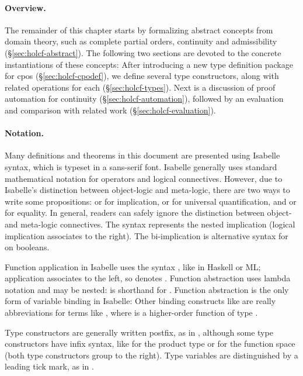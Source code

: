 \paragraph{Overview.} The remainder of this chapter starts by formalizing abstract concepts from domain theory, such as complete partial orders, continuity and admissibility (\S\ref{sec:holcf-abstract}). The following two sections are devoted to the concrete instantiations of these concepts: After introducing a new type definition package for cpos (\S\ref{sec:holcf-cpodef}), we define several type constructors, along with related operations for each (\S\ref{sec:holcf-types}). Next is a discussion of proof automation for continuity (\S\ref{sec:holcf-automation}), followed by an evaluation and comparison with related work (\S\ref{sec:holcf-evaluation}).

\paragraph{Notation.} Many definitions and theorems in this document are presented using Isabelle syntax, which is typeset in a \textsf{sans-serif font}. Isabelle generally uses standard mathematical notation for operators and logical connectives. However, due to Isabelle's distinction between object-logic and meta-logic, there are two ways to write some propositions:  or  for implication,  or  for universal quantification, and  or  for equality. In general, readers can safely ignore the distinction between object- and meta-logic connectives. The syntax  represents the nested implication  (logical implication associates to the right). The bi-implication  is alternative syntax for  on booleans.

Function application in Isabelle uses the syntax , like in Haskell or ML; application associates to the left, so  denotes . Function abstraction uses lambda notation  and may be nested:  is shorthand for . Function abstraction is the only form of variable binding in Isabelle: Other binding constructs like  are really abbreviations for terms like , where  is a higher-order function of type .

Type constructors are generally written postfix, as in , although some type constructors have infix syntax, like  for the product type or  for the function space (both type constructors group to the right). Type variables are distinguished by a leading tick mark, as in .

